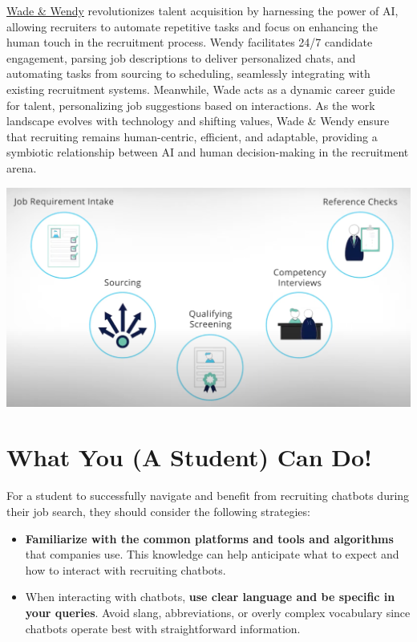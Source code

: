 \documentclass[
]{book}
\providecommand{\tightlist}{%
  \setlength{\itemsep}{0pt}\setlength{\parskip}{0pt}}
\begin{document}
\href{https://wadeandwendy.ai/}{Wade \& Wendy} revolutionizes talent acquisition by harnessing the power of AI, allowing recruiters to automate repetitive tasks and focus on enhancing the human touch in the recruitment process. Wendy facilitates 24/7 candidate engagement, parsing job descriptions to deliver personalized chats, and automating tasks from sourcing to scheduling, seamlessly integrating with existing recruitment systems. Meanwhile, Wade acts as a dynamic career guide for talent, personalizing job suggestions based on interactions. As the work landscape evolves with technology and shifting values, Wade \& Wendy ensure that recruiting remains human-centric, efficient, and adaptable, providing a symbiotic relationship between AI and human decision-making in the recruitment arena.

\includegraphics[width=5.45833in,height=\textheight]{wadewendy pic.png}

\hypertarget{what-you-a-student-can-do}{%
\section{What You (A Student) Can Do!}\label{what-you-a-student-can-do}}

For a student to successfully navigate and benefit from recruiting chatbots during their job search, they should consider the following strategies:

\begin{itemize}
\tightlist
\item
  \textbf{Familiarize with the common platforms and tools and algorithms} that companies use. This knowledge can help anticipate what to expect and how to interact with recruiting chatbots.
\end{itemize}

\begin{itemize}
\tightlist
\item
  When interacting with chatbots, \textbf{use clear language and be specific in your queries}. Avoid slang, abbreviations, or overly complex vocabulary since chatbots operate best with straightforward information.
\end{itemize}
\end{document}
